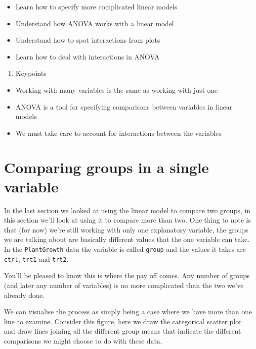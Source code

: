 \documentclass[
]{book}
\providecommand{\tightlist}{%
  \setlength{\itemsep}{0pt}\setlength{\parskip}{0pt}}
\begin{document}
\begin{itemize}
\tightlist
\item
  Learn how to specify more complicated linear models
\item
  Understand how ANOVA works with a linear model
\item
  Understand how to spot interactions from plots
\item
  Learn how to deal with interactions in ANOVA
\end{itemize}

\begin{enumerate}
\def\labelenumi{\arabic{enumi}.}
\setcounter{enumi}{2}
\tightlist
\item
  Keypoints
\end{enumerate}

\begin{itemize}
\tightlist
\item
  Working with many variables is the same as working with just one
\item
  ANOVA is a tool for specifying comparisons between variables in linear models
\item
  We must take care to account for interactions between the variables
\end{itemize}

\hypertarget{comparing-groups-in-a-single-variable}{%
\section{Comparing groups in a single variable}\label{comparing-groups-in-a-single-variable}}

In the last section we looked at using the linear model to compare two groups, in this section we'll look at using it to compare more than two. One thing to note is that (for now) we're still working with only one explanatory variable, the groups we are talking about are basically different values that the one variable can take. In the \texttt{PlantGrowth} data the variable is called \texttt{group} and the values it takes are \texttt{ctrl}, \texttt{trt1} and \texttt{trt2}.

You'll be pleased to know this is where the pay off comes. Any number of groups (and later any number of variables) is no more complicated than the two we've already done.

We can visualise the process as simply being a case where we have more than one line to examine. Consider this figure, here we draw the categorical scatter plot and draw lines joining all the different group means that indicate the different comparisons we might choose to do with these data.
\end{document}
